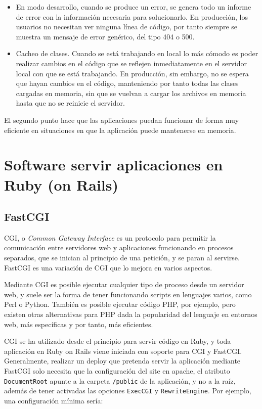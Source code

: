 \begin{itemize}
  \item En modo desarrollo, cuando se produce un error, se genera todo un informe de error con la información necesaria para solucionarlo. En producción, los usuarios no necesitan ver ninguna línea de código, por tanto siempre se muestra un mensaje de error genérico, del tipo 404 o 500.
  \item Cacheo de clases. Cuando se está trabajando en local lo más cómodo es poder realizar cambios en el código que se reflejen inmediatamente en el servidor local con que se está trabajando. En producción, sin embargo, no se espera que hayan cambios en el código, manteniendo por tanto todas las clases cargadas en memoria, sin que se vuelvan a cargar los archivos en memoria hasta que no se reinicie el servidor.
\end{itemize}

El segundo punto hace que las aplicaciones puedan funcionar de forma muy eficiente en situaciones en que la aplicación puede mantenerse en memoria.

\section{Software servir aplicaciones en Ruby (on Rails)} %
\label{sec:software_servir_aplicaciones_en_ruby_on_rails_}

\subsection{FastCGI} %
\label{sub:fastcgi}

CGI, o \emph{Common Gateway Interface} es un protocolo para permitir la comunicación entre servidores web y aplicaciones funcionando en procesos separados, que se inician al principio de una petición, y se paran al servirse. FastCGI es una variación de CGI que lo mejora en varios aspectos.

Mediante CGI es posible ejecutar cualquier tipo de proceso desde un servidor web, y suele ser la forma de tener funcionando scripts en lenguajes varios, como Perl o Python. También es posible ejecutar código PHP, por ejemplo, pero existen otras alternativas para PHP dada la popularidad del lenguaje en entornos web, más específicas y por tanto, más eficientes.

CGI se ha utilizado desde el principio para servir código en Ruby, y toda aplicación en Ruby on Rails viene iniciada con soporte para CGI y FastCGI. Generalmente, realizar un deploy que pretenda servir la aplicación mediante FastCGI solo necesita que la configuración del site en apache, el atributo \texttt{DocumentRoot} apunte a la carpeta \texttt{/public} de la aplicación, y no a la raíz, además de tener activadas las opciones \texttt{ExecCGI} y \texttt{RewriteEngine}. Por ejemplo, una configuración mínima sería:

